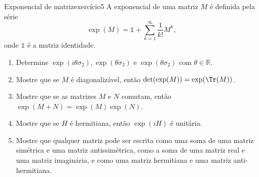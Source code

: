 \begin{exercício}{Exponencial de matriz}{exercício5}
    A exponencial de uma matriz \(M\) é definida pela série
    \begin{equation*}
        \exp(M) = \mathds{1} + \sum_{k = 1}^{\infty} \frac{1}{k!} M^{k},
    \end{equation*}
    onde \(\mathds{1}\) é a matriz identidade.
    \begin{enumerate}[label=(\alph*)]
        \item Determine \(\exp(i\theta \sigma_2), \exp(\theta \sigma_3)\) e \(\exp(\theta \sigma_2)\) com \(\theta \in \mathbb{R}\).
        \item Mostre que se \(M\) é diagonalizável, então \(\det(\exp(M)) = \exp(\Tr(M))\).
        \item Mostre que se as matrizes \(M\) e \(N\) comutam, então \(\exp(M+N) = \exp(M)\exp(N)\).
        \item Mostre que se \(H\) é hermitiana, então \(\exp(iH)\) é unitária.
        \item Mostre que qualquer matriz pode ser escrita como uma soma de uma matriz simétrica e uma matriz antissimétrica, como a soma de uma matriz real e uma matriz imaginária, e como uma matriz hermitiana e uma matriz anti-hermitiana.
    \end{enumerate}
\end{exercício}
